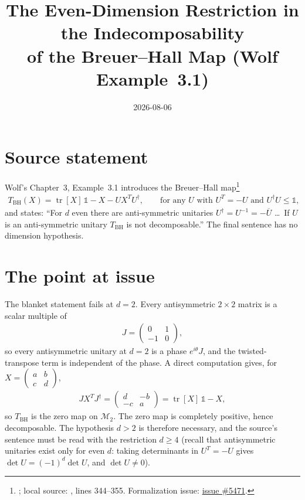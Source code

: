 \documentclass{article}
\title{The Even-Dimension Restriction in the Indecomposability\\
of the Breuer--Hall Map (Wolf Example~3.1)}
\author{}
\date{2026-08-06}
\begin{document}
\maketitle

\section{Source statement}

Wolf's Chapter~3, Example~3.1 introduces the Breuer--Hall
map\footnote{\cite[Chapter~3, Example~3.1]{Wolf2012Quantum}; local source:
, lines
344--355. Formalization issue:
\href{https://github.com/LionSR/TNLean/issues/5471}{issue \#5471}.}
\begin{align}
  T_{\mathrm{BH}}(X)=\operatorname{tr}[X]\,\mathbb 1-X-UX^{T}U^{\dagger},
  \qquad\text{for any $U$ with $U^{T}=-U$ and $U^{\dagger}U\le\mathbb 1$,}
  \tag{3.19}
\end{align}
and states: ``For $d$ even there are anti-symmetric unitaries
$U^{\dagger}=U^{-1}=-\overline{U}$ \dots\ If $U$ is an anti-symmetric unitary
$T_{\mathrm{BH}}$ is not decomposable.''  The final sentence has no dimension
hypothesis.

\section{The point at issue}

The blanket statement fails at $d=2$. Every antisymmetric $2\times2$ matrix
is a scalar multiple of
\begin{align}
  J=\begin{pmatrix} 0 & 1 \\ -1 & 0 \end{pmatrix},
\end{align}
so every antisymmetric unitary at $d=2$ is a phase $e^{i\theta}J$, and the
twisted-transpose term is independent of the phase. A direct computation
gives, for $X=(\begin{smallmatrix} a & b \\ c & d\end{smallmatrix})$,
\begin{align}
  JX^{T}J^{\dagger}
  =\begin{pmatrix} d & -b \\ -c & a\end{pmatrix}
  =\operatorname{tr}[X]\,\mathbb 1-X,
\end{align}
so $T_{\mathrm{BH}}$ is the zero map on $\mathcal M_2$. The zero map is
completely positive, hence decomposable. The hypothesis $d>2$ is therefore
necessary, and the source's sentence must be read with the restriction
$d\ge4$ (recall that antisymmetric unitaries exist only for even $d$: taking
determinants in $U^{T}=-U$ gives $\det U=(-1)^{d}\det U$, and $\det U\ne0$).
\end{document}
